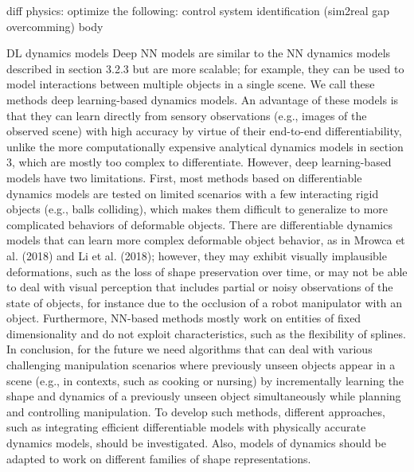 \documentclass[\home/main.tex]{subfiles}
\begin{document}
diff physics:
    optimize the following:
        control
        system identification  (sim2real gap overcomming)
        body 


        DL dynamics models 
        Deep NN models are similar to      the NN dynamics models described in section 3.2.3 but are more
        scalable; for example, they can be used to model interactions
        between multiple objects in a single scene. We call these
        methods deep learning-based dynamics models. An advantage
        of these models is that they can learn directly from sensory
        observations (e.g., images of the observed scene) with high
        accuracy by virtue of their end-to-end differentiability, unlike
        the more computationally expensive analytical dynamics models
        in section 3, which are mostly too complex to differentiate.
        However, deep learning-based models have two limitations. First,
        most methods based on differentiable dynamics models are tested
        on limited scenarios with a few interacting rigid objects (e.g.,
        balls colliding), which makes them difficult to generalize to
        more complicated behaviors of deformable objects. There are
        differentiable dynamics models that can learn more complex
        deformable object behavior, as in Mrowca et al. (2018) and Li
        et al. (2018); however, they may exhibit visually implausible
        deformations, such as the loss of shape preservation over time,
        or may not be able to deal with visual perception that includes
        partial or noisy observations of the state of objects, for instance
        due to the occlusion of a robot manipulator with an object.
        Furthermore, NN-based methods mostly work on entities of fixed
        dimensionality and do not exploit characteristics, such as the
        flexibility of splines.
        In conclusion, for the future we need algorithms that
        can deal with various challenging manipulation scenarios
        where previously unseen objects appear in a scene (e.g.,
        in contexts, such as cooking or nursing) by incrementally
        learning the shape and dynamics of a previously unseen object
        simultaneously while planning and controlling manipulation.
        To develop such methods, different approaches, such as
        integrating efficient differentiable models with physically
        accurate dynamics models, should be investigated. Also, models
        of dynamics should be adapted to work on different families of
        shape representations.
\end{document}
